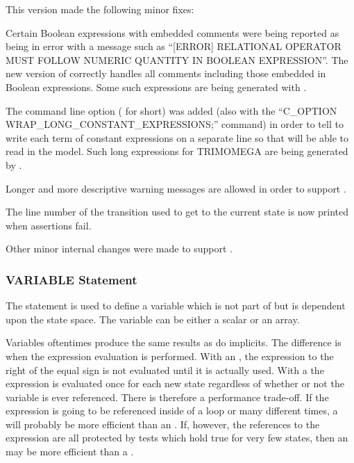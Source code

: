 This version made the following minor fixes:
\begin{indenteditems}
\item Certain Boolean expressions with embedded comments were being reported
      as being in error with a message such
      as ``[ERROR] RELATIONAL OPERATOR MUST FOLLOW NUMERIC
      QUANTITY IN BOOLEAN EXPRESSION''.   The new version of 
      correctly handles all comments including those embedded in Boolean
      expressions.   Some such expressions
      are being generated with .
\item The command line option
      ( for short)
      was added (also with the ``C\_OPTION WRAP\_LONG\_CONSTANT\_EXPRESSIONS;''
      command) in order to tell  to write each term of constant
      expressions on a separate line so that 
      will be able to read in the model.   Such long expressions for TRIMOMEGA
      are being generated by .
\item Longer and more descriptive warning messages are allowed in order to
      support .
\item The line number of the transition used to get to the current state
      is now printed when assertions fail.
\item Other minor internal changes were made to support .
\end{indenteditems}

\subsubsection{VARIABLE Statement}
\label{sec:VARIABLE}

The  statement is used to define a variable which is not part
of but is dependent upon the state space.   The variable can be either a
scalar or an array.

Variables oftentimes produce the same results as do implicits.   The difference
is when the expression evaluation is performed.   With an , the
expression to the right of the equal sign is not evaluated until it is
actually used.   With a  the expression is evaluated once for
each new state regardless of whether or not the variable is ever referenced.
There is therefore a performance trade-off.   If the expression is going
to be referenced inside of a loop or many different times, a 
will probably be more efficient than an .   If, however, the
references to the expression are all protected by  tests which
hold true for very few states, then an  may be more efficient
than a .

